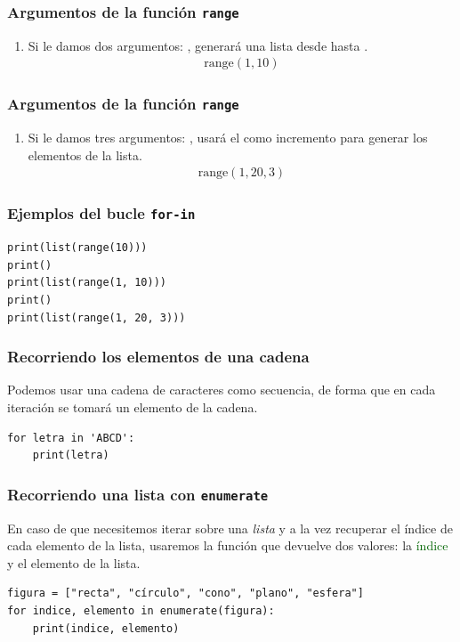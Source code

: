 \documentclass[12pt]{beamer}
\begin{document}
\begin{frame}
\frametitle{Argumentos de la función \texttt{range}}
\begin{enumerate}[<+->]
\conti    
\item Si le damos dos argumentos: , generará una lista desde  hasta .
\pause
\begin{align*}
\mbox{range} (1, 10)
\end{align*}
\seti
\end{enumerate}  
\end{frame}
\begin{frame}
\frametitle{Argumentos de la función \texttt{range}}
\begin{enumerate}[<+->]
\conti
\item Si le damos tres argumentos: \break \hfill {}, usará el  como incremento para generar los elementos de la lista.
\pause
\begin{align*}
\mbox{range} (1, 20, 3)
\end{align*}    
\end{enumerate}  
\end{frame}
\begin{frame}[fragile]
\frametitle{Ejemplos del bucle \texttt{for-in}}
\begin{lstlisting}[caption=Ejemplos con varios parámetros en la función range]
print(list(range(10)))
print()
print(list(range(1, 10)))
print()
print(list(range(1, 20, 3)))
\end{lstlisting}
\end{frame}
\begin{frame}[fragile]
\frametitle{Recorriendo los elementos de una cadena}
Podemos usar una cadena de caracteres como secuencia, de forma que en cada iteración se tomará un elemento de la cadena.
\pause
\begin{lstlisting}[caption=Recorriendo una cadena]
for letra in 'ABCD':
    print(letra)
\end{lstlisting}
\end{frame}
\begin{frame}[fragile]
\frametitle{Recorriendo una lista con \texttt{enumerate}}
En caso de que necesitemos iterar sobre una \emph{lista} y a la vez recuperar el índice de cada elemento de la lista, \pause usaremos la función  que devuelve dos valores: la \textcolor{darkgreen}{índice} y el \textcolor{lava}{elemento} de la lista.
\pause
\begin{lstlisting}[caption=Recorriendo con índices y elementos de una lista]
figura = ["recta", "círculo", "cono", "plano", "esfera"]
for indice, elemento in enumerate(figura):
    print(indice, elemento)
\end{lstlisting}
\end{frame}
\end{document}
